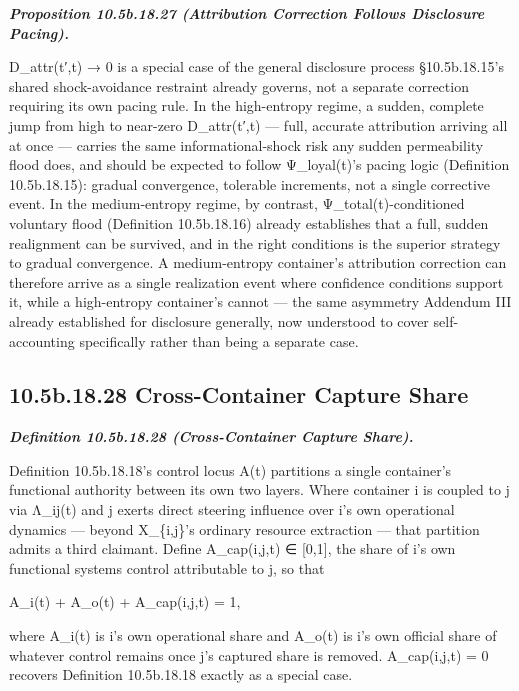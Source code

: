 \documentclass[
]{article}
\begin{document}
\emph{\textbf{Proposition 10.5b.18.27 (Attribution Correction Follows
Disclosure Pacing).}}

D\_attr(t′,t) → 0 is a special case of the general disclosure process
§10.5b.18.15's shared shock-avoidance restraint already governs, not a
separate correction requiring its own pacing rule. In the high-entropy
regime, a sudden, complete jump from high to near-zero D\_attr(t′,t) ---
full, accurate attribution arriving all at once --- carries the same
informational-shock risk any sudden permeability flood does, and should
be expected to follow Ψ\_loyal(t)'s pacing logic (Definition
10.5b.18.15): gradual convergence, tolerable increments, not a single
corrective event. In the medium-entropy regime, by contrast,
Ψ\_total(t)-conditioned voluntary flood (Definition 10.5b.18.16) already
establishes that a full, sudden realignment can be survived, and in the
right conditions is the superior strategy to gradual convergence. A
medium-entropy container's attribution correction can therefore arrive
as a single realization event where confidence conditions support it,
while a high-entropy container's cannot --- the same asymmetry Addendum
III already established for disclosure generally, now understood to
cover self-accounting specifically rather than being a separate case.

\hypertarget{b.18.28-cross-container-capture-share}{%
\subsection{10.5b.18.28 Cross-Container Capture
Share}\label{b.18.28-cross-container-capture-share}}

\emph{\textbf{Definition 10.5b.18.28 (Cross-Container Capture Share).}}

Definition 10.5b.18.18's control locus A(t) partitions a single
container's functional authority between its own two layers. Where
container i is coupled to j via Λ\_ij(t) and j exerts direct steering
influence over i's own operational dynamics --- beyond X\_\{i,j\}'s
ordinary resource extraction --- that partition admits a third claimant.
Define A\_cap(i,j,t) ∈ {[}0,1{]}, the share of i's own functional
systems control attributable to j, so that

A\_i(t) + A\_o(t) + A\_cap(i,j,t) = 1,

where A\_i(t) is i's own operational share and A\_o(t) is i's own
official share of whatever control remains once j's captured share is
removed. A\_cap(i,j,t) = 0 recovers Definition 10.5b.18.18 exactly as a
special case.
\end{document}
